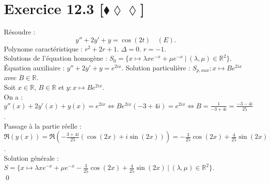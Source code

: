 \documentclass[10pt]{article}
\begin{document}
\section*{Exercice 12.3 [$\blacklozenge\lozenge\lozenge$]}
\begin{tcolorbox}[enhanced, width=7in, center, size=fbox, fontupper=\large, drop shadow southwest]
    Résoudre :
    \begin{equation*}
        y'' + 2y' + y = \cos(2t) \quad (E).
    \end{equation*}
    Polynome caractéristique : $r^2 + 2r + 1$. $\Delta = 0$. $r = -1$.\\
    Solutions de l'équation homogène : $S_0 = \{x \mapsto \lambda x e^{-x} + \mu e ^{-x} ~ | ~ (\lambda, \mu) \in \mathbb{R}^2\}$.\\
    Équation auxiliaire : $y'' + 2y' + y = e^{2ix}$. Solution particulière : $S_{p,aux} : x\mapsto Be^{2ix}$ avec $B\in\mathbb{R}$.\\
    Soit $x\in\mathbb{R}$, $B\in\mathbb{R}$ et $y:x\mapsto Be^{2ix}$.\\
    On a : $y''(x) + 2y'(x) + y(x) = e^{2ix} \iff Be^{2ix}(-3+4i)= e^{2ix} \iff B = \frac{1}{-3+4i} = \frac{-3-4i}{25}$.\\
    Passage à la partie réelle : $\Re(y(x)) = \Re\left( -\frac{3+4i}{25}\left( \cos(2x) + i\sin(2x) \right) \right) = -\frac{3}{25}\cos(2x) + \frac{4}{25}\sin(2x)$.\\
    Solution générale : $S = \{x \mapsto \lambda x e^{-x} + \mu e^{-x} - \frac{3}{25}\cos(2x) + \frac{4}{25}\sin(2x) ~ | ~ (\lambda, \mu) \in \mathbb{R}^2\}$.\\
    \qed
\end{tcolorbox}
\end{document}
